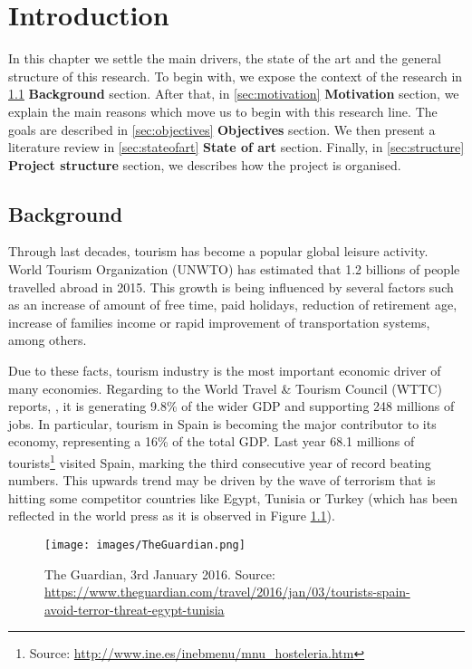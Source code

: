 \documentclass[a4paper,10pt]{book}
\begin{document}
 \chapter{Introduction}
 
 In this chapter we settle the main drivers, the state of the art and the general structure of this research. To begin with, we expose the context of the research in \ref{sec:background} \textbf{Background} section. After that, in \ref{sec:motivation} \textbf{Motivation} section, we explain the main reasons which move us to begin with this research line. The goals are described in \ref{sec:objectives} \textbf{Objectives} section. We then present a literature review in \ref{sec:stateofart} \textbf{State of art} section. Finally, in \ref{sec:structure} \textbf{Project structure} section, we describes how the project is organised. 

 
  \section{Background} \label{sec:background}
  
  Through last decades, tourism has become a popular global leisure activity. World Tourism Organization (UNWTO) has estimated that 1.2 billions of people travelled abroad in 2015. This growth is being influenced by several factors such as an increase of amount of free time, paid holidays, reduction of retirement age, increase of families income or rapid improvement of transportation systems, among others.
  
  Due to these facts, tourism industry is the most important economic driver of many economies. Regarding to the World Travel \& Tourism Council (WTTC) reports, \cite{wttc2016tourism}, it is generating 9.8\% of the wider GDP and supporting 248 millions of jobs. In particular, tourism in Spain is becoming the major contributor to its economy, representing  a 16\% of the total GDP. Last year 68.1 millions of tourists\footnote{Source: \url{http://www.ine.es/inebmenu/mnu_hosteleria.htm}} visited Spain, marking the third consecutive year of record beating numbers. This upwards trend may be driven by the wave of terrorism that is hitting some competitor countries like Egypt, Tunisia or Turkey (which has been reflected in the world press as it is observed in Figure \ref{fig:TheGuardian}).
  
\begin{figure}[h]
    \centering
    \texttt{[image: images/TheGuardian.png]}
    \caption{The Guardian, 3rd January 2016. Source: \url{https://www.theguardian.com/travel/2016/jan/03/tourists-spain-avoid-terror-threat-egypt-tunisia}}
    \label{fig:TheGuardian}
\end{figure}  
\end{document}
